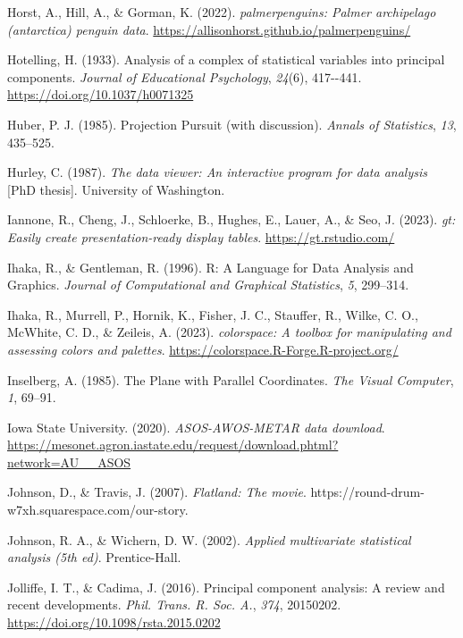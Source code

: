 \documentclass[
  letterpaper,
]{krantz}
\newlength{\cslhangindent}
\newenvironment{CSLReferences}[2] %
 {\begin{list}{}{%
  \setlength{\itemindent}{0pt}
  \setlength{\leftmargin}{0pt}
  \setlength{\parsep}{0pt}
  \ifodd #1
   \setlength{\leftmargin}{\cslhangindent}
   \setlength{\itemindent}{-1\cslhangindent}
  \fi
  \setlength{\itemsep}{#2\baselineskip}}}
 {\end{list}}
\begin{document}
\begin{CSLReferences}{1}{0}
Horst, A., Hill, A., \& Gorman, K. (2022). \emph{{palmerpenguins}:
Palmer archipelago (antarctica) penguin data}.
\url{https://allisonhorst.github.io/palmerpenguins/}

Hotelling, H. (1933). Analysis of a complex of statistical variables
into principal components. \emph{Journal of Educational Psychology},
\emph{24}(6), 417-\/-441. \url{https://doi.org/10.1037/h0071325}

Huber, P. J. (1985). {P}rojection {P}ursuit (with discussion).
\emph{Annals of Statistics}, \emph{13}, 435--525.

Hurley, C. (1987). \emph{The data viewer: An interactive program for
data analysis} {[}PhD thesis{]}. University of Washington.

Iannone, R., Cheng, J., Schloerke, B., Hughes, E., Lauer, A., \& Seo, J.
(2023). \emph{{gt}: Easily create presentation-ready display tables}.
\url{https://gt.rstudio.com/}

Ihaka, R., \& Gentleman, R. (1996). R: {A} {L}anguage for {D}ata
{A}nalysis and {G}raphics. \emph{Journal of Computational and Graphical
Statistics}, \emph{5}, 299--314.

Ihaka, R., Murrell, P., Hornik, K., Fisher, J. C., Stauffer, R., Wilke,
C. O., McWhite, C. D., \& Zeileis, A. (2023). \emph{{colorspace}: A
toolbox for manipulating and assessing colors and palettes}.
\url{https://colorspace.R-Forge.R-project.org/}

Inselberg, A. (1985). {T}he {P}lane with {P}arallel {C}oordinates.
\emph{The Visual Computer}, \emph{1}, 69--91.

Iowa State University. (2020). \emph{ASOS-AWOS-METAR data download}.
\url{https://mesonet.agron.iastate.edu/request/download.phtml?network=AU__ASOS}

Johnson, D., \& Travis, J. (2007). \emph{Flatland: The movie}.
https://round-drum-w7xh.squarespace.com/our-story.

Johnson, R. A., \& Wichern, D. W. (2002). \emph{Applied multivariate
statistical analysis (5th ed)}. Prentice-Hall.

Jolliffe, I. T., \& Cadima, J. (2016). Principal component analysis: A
review and recent developments. \emph{Phil. Trans. R. Soc. A.},
\emph{374}, 20150202. \url{https://doi.org/10.1098/rsta.2015.0202}


\end{CSLReferences}
\end{document}
